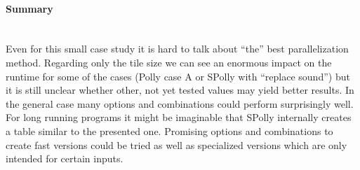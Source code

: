 \paragraph*{Summary} ~\\
Even for this small case study it is hard to talk about ``the'' best parallelization method.
Regarding only the tile size we can see an enormous impact on the runtime for 
some of the cases (Polly case A or SPolly with ``replace sound'') but it is still
unclear whether other, not yet tested values may yield better results. 
In the general case many options and combinations could perform surprisingly well. 
For long running programs it might be imaginable that SPolly internally 
creates a table similar to the presented one. 
Promising options and combinations to create fast versions could be tried 
as well as specialized versions which are only intended for certain inputs.  




\clearpage

